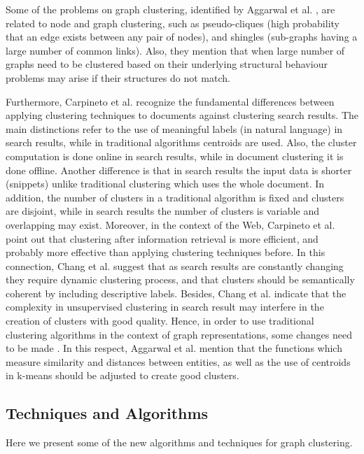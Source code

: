 \documentclass[runningheads]{llncs}
\begin{document}
Some of the problems on graph clustering, identified by Aggarwal et al. \cite{Aggarwal}, are related to node and graph clustering, such as pseudo-cliques (high probability that an edge exists between any pair of nodes), and shingles (sub-graphs having a large number of common links). Also, they mention that when large number of graphs need to be clustered based on their underlying structural behaviour problems may arise if their structures do not match. 

Furthermore, Carpineto et al. \cite{Carpineto} recognize the fundamental differences between applying clustering techniques to documents against clustering search results. The main distinctions refer to the use of meaningful labels (in natural language) in search results, while in traditional algorithms centroids are used. Also, the cluster computation is done online in search results, while in document clustering it is done offline. Another difference is that in search results the input data is shorter (snippets) unlike traditional clustering which uses the whole document. In addition, the number of clusters in a traditional algorithm is fixed and clusters are disjoint, while in search results the number of clusters is variable and overlapping may exist. Moreover, in the context of the Web, Carpineto et al. \cite{Carpineto} point out that clustering after information retrieval is more efficient, and probably more effective than applying clustering techniques before. In this connection, Chang et al. \cite{Chang} suggest that as search results are constantly changing they require dynamic clustering process, and that clusters should be semantically coherent by including descriptive labels. Besides, Chang et al. \cite{Chang} indicate that the complexity in unsupervised clustering in search result may interfere in the creation of clusters with good quality. Hence, in order to use traditional clustering algorithms in the context of graph representations, some changes need to be made \cite{Aggarwal}. In this respect, Aggarwal et al. \cite{Aggarwal} mention that the functions which measure similarity and distances between entities, as well as the use of centroids in k-means should be adjusted to create good clusters.

\subsection{Techniques and Algorithms}\label{algorithms}
Here we present some of the new algorithms and techniques for graph clustering.
\end{document}
